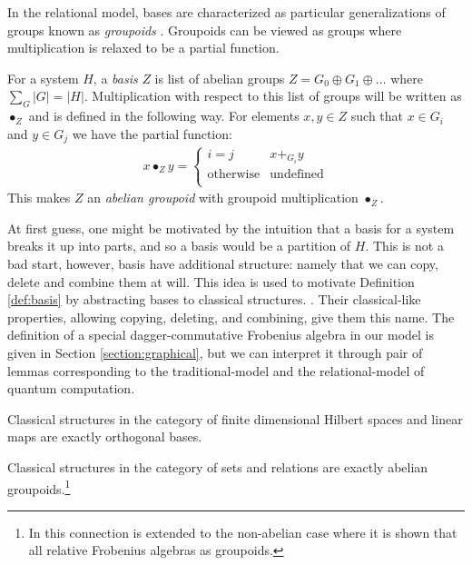 In the relational model, bases are characterized as particular generalizations of groups known as \textit{groupoids} \cite{pavlovic-2009}\cite{evans2009classifying}.  Groupoids can be viewed as groups where multiplication is relaxed to be a partial function.

\begin{defn}
\label{def:basis}
For a system $H$, a \emph{basis} $Z$ is list of abelian groups $Z = G_0\oplus G_1\oplus...$ where $\sum_G |G| = |H|$.
Multiplication with respect to this list of groups will be written as $\bullet_Z$ and is defined in the following way. For elements $x,y\in Z$ such that $x\in G_i$ and $y\in G_j$ we have the partial function:
\begin{align}
\label{eq:groupoid_mult}
x\bullet_Zy = \begin{cases}i=j & x +_{G_i} y \\
\mbox{otherwise} & \mbox{undefined}\\
\end{cases}
\end{align}
\noindent This makes $Z$ an \emph{abelian groupoid} with groupoid multiplication $\bullet_Z$.
\end{defn}

At first guess, one might be motivated by the intuition that a basis for a system breaks it up into parts, and so a basis would be a partition of $H$.  This is not a bad start, however, basis have additional structure: namely that we can copy, delete and combine them at will.  This idea is used to motivate Definition \ref{def:basis} by abstracting bases to classical structures. .
Their classical-like properties, allowing copying, deleting, and combining, give them this name. The definition of a special dagger-commutative Frobenius algebra in our model is given in Section \ref{section:graphical}, but we can interpret it through pair of lemmas corresponding to the traditional-model and the relational-model of quantum computation.
\begin{lemma}
\label{lem:sdfa-hilb}
Classical structures in the category of finite dimensional Hilbert spaces and linear maps are exactly orthogonal bases.
\end{lemma}

\begin{lemma}
\label{lem:sdfa-rel}
Classical structures in the category of sets and relations are exactly abelian groupoids.\footnote{In \cite{heunen-relFrob} this connection is extended to the non-abelian case where it is shown that all relative Frobenius algebras as groupoids.}
\end{lemma}

